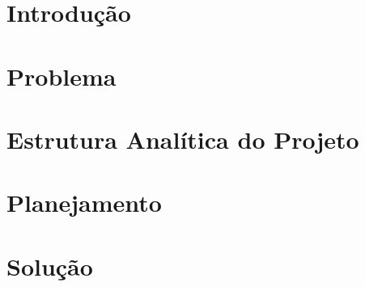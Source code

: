 \chapter{Introdução}


\chapter{Problema}


\chapter{Estrutura Analítica do Projeto}


\chapter{Planejamento}


\chapter{Solução}
